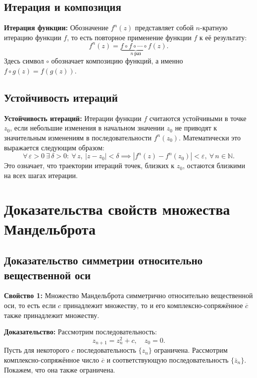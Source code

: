 \documentclass{article}
\begin{document}
	\subsection{Итерация и композиция}
	\textbf{Итерация функции:} Обозначение $f^n(z)$ представляет собой $n$-кратную итерацию функции $f$, то есть повторное применение функции $f$ к её результату:
	\begin{equation}
		f^n(z) = \underbrace{f \circ f \circ \cdots \circ f}_{n\ \text{раз}}(z).
	\end{equation}
	Здесь символ $\circ$ обозначает композицию функций, а именно $f \circ g(z) = f(g(z))$.
	
	\subsection{Устойчивость итераций}
	\textbf{Устойчивость итераций:} Итерации функции $f$ считаются устойчивыми в точке $z_0$, если небольшие изменения в начальном значении $z_0$ не приводят к значительным изменениям в последовательности $f^n(z_0)$. Математически это выражается следующим образом:
	\begin{equation}
		\forall\, \varepsilon > 0\ \exists\, \delta > 0:\ \forall\, z,\ |z - z_0| < \delta \implies |f^n(z) - f^n(z_0)| < \varepsilon,\ \forall\, n \in \mathbb{N}.
	\end{equation}
	Это означает, что траектории итераций точек, близких к $z_0$, остаются близкими на всех шагах итерации.
	
	\newpage
	
	\section{Доказательства свойств множества Мандельброта}
	
	\subsection{Доказательство симметрии относительно вещественной оси}
	\textbf{Свойство 1:} Множество Мандельброта симметрично относительно вещественной оси, то есть если $c$ принадлежит множеству, то и его комплексно-сопряжённое $\overline{c}$ также принадлежит множеству.
	
	\textbf{Доказательство:}
	Рассмотрим последовательность:
	\begin{equation}
		z_{n+1} = z_n^2 + c, \quad z_0 = 0.
	\end{equation}
	Пусть для некоторого $c$ последовательность $\{z_n\}$ ограничена. Рассмотрим комплексно-сопряжённое число $\overline{c}$ и соответствующую последовательность $\{\overline{z}_n\}$. Покажем, что она также ограничена.
	
\end{document}
